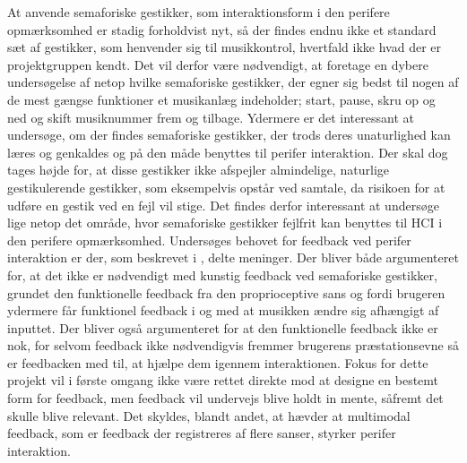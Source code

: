 At anvende semaforiske gestikker, som interaktionsform i den perifere opmærksomhed er stadig forholdvist nyt, så der findes endnu ikke et standard sæt af gestikker, som henvender sig til musikkontrol, hvertfald ikke hvad der er projektgruppen kendt. Det vil derfor være nødvendigt, at foretage en dybere undersøgelse af netop hvilke semaforiske gestikker, der egner sig bedst til nogen af de mest gængse funktioner et musikanlæg indeholder; start, pause, skru op og ned og skift musiknummer frem og tilbage. Ydermere er det interessant at undersøge, om der findes semaforiske gestikker, der trods deres unaturlighed kan læres og genkaldes og på den måde benyttes til perifer interaktion. Der skal dog tages højde for, at disse gestikker ikke afspejler almindelige, naturlige gestikulerende gestikker, som eksempelvis opstår ved samtale, da risikoen for at udføre en gestik ved en fejl vil stige. Det findes derfor interessant at undersøge lige netop det område, hvor semaforiske gestikker fejlfrit kan benyttes til HCI i den perifere opmærksomhed. \blankline
%
Undersøges behovet for feedback ved perifer interaktion er der, som beskrevet i , delte meninger. Der bliver både argumenteret for, at det ikke er nødvendigt med kunstig feedback ved semaforiske gestikker, grundet den funktionelle feedback fra den proprioceptive sans og fordi brugeren ydermere får funktionel feedback i og med at musikken ændre sig afhængigt af inputtet. Der bliver også argumenteret for at den funktionelle feedback ikke er nok, for selvom feedback ikke nødvendigvis fremmer brugerens præstationsevne så er feedbacken med til, at hjælpe dem igennem interaktionen. Fokus for dette projekt vil i første omgang ikke være rettet direkte mod at designe en bestemt form for feedback, men feedback vil undervejs blive holdt in mente, såfremt det skulle blive relevant. Det skyldes, blandt andet, at \textcite[s. 21]{PDF:FacilitatingPIDesignAndEvaluation} hævder at multimodal feedback, som er feedback der registreres af flere sanser, styrker perifer interaktion. 

